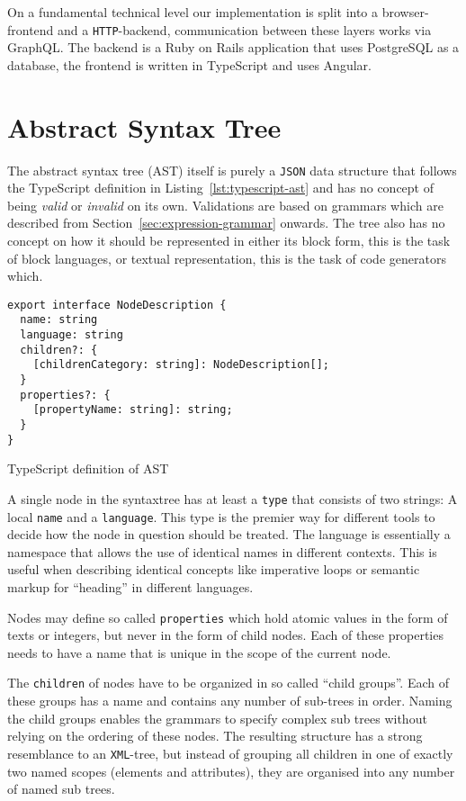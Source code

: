 \documentclass[sigconf,natbib=false,review=true,anonymous]{acmart}
\begin{document}
On a fundamental technical level our implementation is split into a browser-frontend and a \texttt{HTTP}-backend, communication between these layers works via GraphQL. The backend is a Ruby on Rails application that uses PostgreSQL as a database, the frontend is written in TypeScript and uses Angular.

\section{Abstract Syntax Tree}

The abstract syntax tree (AST) itself is purely a \texttt{JSON} data structure that follows the TypeScript definition in Listing~\ref{lst:typescript-ast} and has no concept of being \textit{valid} or \textit{invalid} on its own. Validations are based on grammars which are described from Section~\ref{sec:expression-grammar} onwards. The tree also has no concept on how it should be represented in either its block form, this is the task of block languages, or textual representation, this is the task of code generators which.

\begin{listing}[H]
\begin{verbatim}
export interface NodeDescription {
  name: string
  language: string
  children?: {
    [childrenCategory: string]: NodeDescription[];
  }
  properties?: {
    [propertyName: string]: string;
  }
}
\end{verbatim}
\caption{TypeScript definition of AST}
\label{lst:typescript-ast}
\end{listing}

A single node in the syntaxtree has at least a \texttt{type} that consists of two strings: A local \texttt{name} and a \texttt{language}. This type is the premier way for different tools to decide how the node in question should be treated. The language is essentially a namespace that allows the use of identical names in different contexts. This is useful when describing identical concepts like imperative loops or semantic markup for \enquote{heading} in different languages.

Nodes may define so called \texttt{properties} which hold atomic values in the form of texts or integers, but never in the form of child nodes. Each of these properties needs to have a name that is unique in the scope of the current node.

The \texttt{children} of nodes have to be organized in so called \enquote{child groups}. Each of these groups has a name and contains any number of sub-trees in order. Naming the child groups enables the grammars to specify complex sub trees without relying on the ordering of these nodes. The resulting structure has a strong resemblance to an \texttt{XML}-tree, but instead of grouping all children in one of exactly two named scopes (elements and attributes), they are organised into any number of named sub trees.
\end{document}
